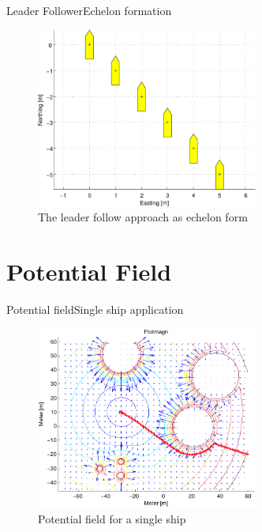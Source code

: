 \documentclass[10pt,handout]{beamer}
\begin{document}
\begin{frame}{Leader Follower}{Echelon formation}
  \begin{figure}
    \includegraphics[width=0.65\textwidth]{img/echelon}
    \caption{The leader follow approach as echelon form}
    \label{fig:echelon}
  \end{figure}
\end{frame}

\section{Potential Field}

\begin{frame}{Potential field}{Single ship application}
  \begin{figure}
    \includegraphics[width=0.65\textwidth]{img/ftotmagnfigpdf}
    \caption{Potential field for a single ship}
    \label{fig:potsingleship}
  \end{figure}
\end{frame}
\end{document}
